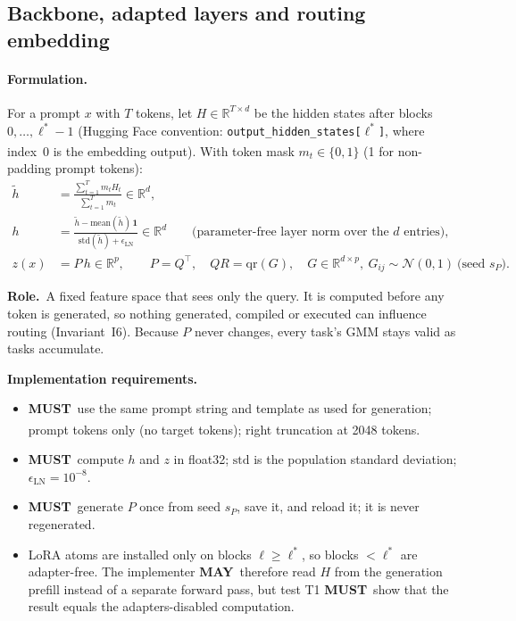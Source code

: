 \documentclass[11pt]{article}
\newcommand{\R}{\mathbb{R}}
\newcommand{\T}{^{\top}}
\newcommand{\tagthesis}{\textsuperscript{\textcolor{teal!70!black}{\sffamily[thesis]}}}
\newcommand{\tagassumed}{\textsuperscript{\textcolor{red!70!black}{\sffamily[assumed]}}}
\newcommand{\MUST}{\textbf{MUST}}
\newcommand{\MAY}{\textbf{MAY}}
\newcommand{\role}{\par\noindent\textbf{Role.}\ }
\newcommand{\impl}{\par\noindent\textbf{Implementation requirements.}\ }
\begin{document}
\subsection{Backbone, adapted layers and routing embedding}\label{sec:embed}

\paragraph{Formulation.} For a prompt $x$ with $T$ tokens, let $H\in\R^{T\times d}$ be the hidden states after
blocks $0,\dots,\ell^*-1$ (Hugging Face convention: \texttt{output\_hidden\_states[}$\ell^*$\texttt{]}, where index~0
is the embedding output)\tagassumed. With token mask $m_t\in\{0,1\}$ (1 for non-padding prompt tokens):
\begin{align}
  \tilde h &= \frac{\sum_{t=1}^{T} m_t H_t}{\sum_{t=1}^{T} m_t}\in\R^{d}, \\
  h &= \frac{\tilde h-\mathrm{mean}(\tilde h)\,\mathbf 1}{\mathrm{std}(\tilde h)+\epsilon_{\mathrm{LN}}}\in\R^{d}
  \qquad\text{(parameter-free layer norm over the $d$ entries)}, \\
  z(x) &= P\,h\in\R^{p}, \qquad P=Q\T,\quad QR=\mathrm{qr}(G),\quad G\in\R^{d\times p},\ G_{ij}\sim\mathcal N(0,1)\ \text{(seed $s_P$)}.
\end{align}

\role A fixed feature space that sees only the query. It is computed before any token is generated, so nothing
generated, compiled or executed can influence routing (Invariant~I6). Because $P$ never changes, every task's
GMM stays valid as tasks accumulate.

\impl
\begin{itemize}[leftmargin=*]
  \item \MUST\ use the same prompt string and template as used for generation; prompt tokens only (no target
        tokens); right truncation at 2048 tokens\tagthesis.
  \item \MUST\ compute $h$ and $z$ in float32; $\mathrm{std}$ is the population standard deviation; $\epsilon_{\mathrm{LN}}=10^{-8}$.
  \item \MUST\ generate $P$ once from seed $s_P$, save it, and reload it; it is never regenerated.
  \item LoRA atoms are installed only on blocks $\ell\ge\ell^*$, so blocks $<\ell^*$ are adapter-free. The
        implementer \MAY\ therefore read $H$ from the generation prefill instead of a separate forward pass, but test
        T1 \MUST\ show that the result equals the adapters-disabled computation.
\end{itemize}
\end{document}
